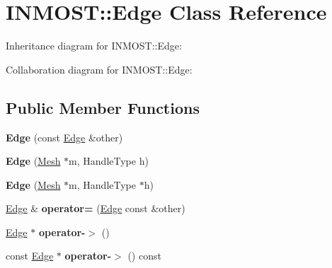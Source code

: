 \hypertarget{classINMOST_1_1Edge}{\section{I\-N\-M\-O\-S\-T\-:\-:Edge Class Reference}
\label{classINMOST_1_1Edge}
}


Inheritance diagram for I\-N\-M\-O\-S\-T\-:\-:Edge\-:


Collaboration diagram for I\-N\-M\-O\-S\-T\-:\-:Edge\-:
\subsection*{Public Member Functions}
\begin{DoxyCompactItemize}
\item 
\hypertarget{classINMOST_1_1Edge_a5304345db2e5281455e2ef574d8ded70}{{\bfseries Edge} (const \hyperlink{classINMOST_1_1Edge}{Edge} \&other)}\label{classINMOST_1_1Edge_a5304345db2e5281455e2ef574d8ded70}

\item 
\hypertarget{classINMOST_1_1Edge_ae963d37a92085320893d846226c3027d}{{\bfseries Edge} (\hyperlink{classINMOST_1_1Mesh}{Mesh} $\ast$m, Handle\-Type h)}\label{classINMOST_1_1Edge_ae963d37a92085320893d846226c3027d}

\item 
\hypertarget{classINMOST_1_1Edge_aaaae84f52183a0faa90259d0020c0a39}{{\bfseries Edge} (\hyperlink{classINMOST_1_1Mesh}{Mesh} $\ast$m, Handle\-Type $\ast$h)}\label{classINMOST_1_1Edge_aaaae84f52183a0faa90259d0020c0a39}

\item 
\hypertarget{classINMOST_1_1Edge_a94ce93c2543797423d9505bce0ba77a8}{\hyperlink{classINMOST_1_1Edge}{Edge} \& {\bfseries operator=} (\hyperlink{classINMOST_1_1Edge}{Edge} const \&other)}\label{classINMOST_1_1Edge_a94ce93c2543797423d9505bce0ba77a8}

\item 
\hypertarget{classINMOST_1_1Edge_a55a79bd76daa99a5b27e5e47a179b318}{\hyperlink{classINMOST_1_1Edge}{Edge} $\ast$ {\bfseries operator-\/$>$} ()}\label{classINMOST_1_1Edge_a55a79bd76daa99a5b27e5e47a179b318}

\item 
\hypertarget{classINMOST_1_1Edge_a6e0a5b2c149f6da32e29a1381a9fea2b}{const \hyperlink{classINMOST_1_1Edge}{Edge} $\ast$ {\bfseries operator-\/$>$} () const }\label{classINMOST_1_1Edge_a6e0a5b2c149f6da32e29a1381a9fea2b}


\end{DoxyCompactItemize}
